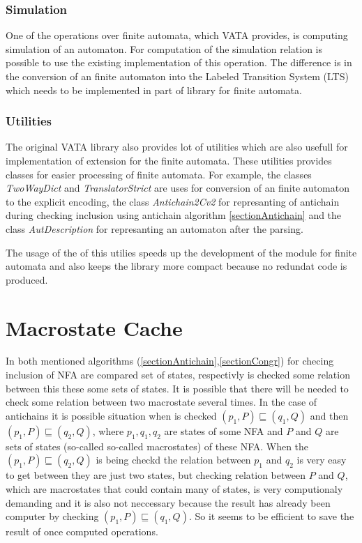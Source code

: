 \subsubsection{Simulation}
One of the operations over finite automata, which VATA provides, is computing simulation of an automaton. For computation of the simulation relation
is possible to use the existing implementation of this operation. 
The difference is in the conversion of an finite automaton into the Labeled Transition System (LTS) which
needs to be implemented in part of library for finite automata.

\subsubsection{Utilities}
The original VATA library also provides lot of utilities which are also usefull for implementation of extension for the finite automata. These utilities
provides classes for easier processing of finite automata. For example, the classes \emph{TwoWayDict} and \emph{TranslatorStrict} are uses for conversion
of an finite automaton to the explicit encoding, the class \emph{Antichain2Cv2} for represanting of antichain during checking inclusion using
antichain algorithm \ref{sectionAntichain} and the class \emph{AutDescription} for represanting an automaton after the parsing.

The usage of the of this utilies speeds up the development of the module for finite automata and also keeps the library more compact because no
redundat code is produced.

\section{Macrostate Cache}
\label{sectionCache}
In both mentioned algorithms (\ref{sectionAntichain},\ref{sectionCongr}) for checing inclusion of NFA are compared set of states, 
respectivly is checked some relation between this these some sets of states. It is possible that there will be needed to check some relation between
two macrostate several times. In the case of antichains it is possible situation when is checked $(p_1,P) \sqsubseteq (q_1,Q)$ and then $(p_1,P)\sqsubseteq
(q_2,Q)$, where $p_1,q_1,q_2$ are states of some NFA and $P$ and $Q$ are sets of states (so-called  so-called macrostates) of these NFA. 
When the $(p_1,P)\sqsubseteq(q_2,Q)$ is being checkd the relation between $p_1$ and $q_2$ is very easy to get between they are just two states, but checking
relation between $P$ and $Q$, which are macrostates that could contain many of states, is very computionaly demanding and it is also not neccessary because
the result has already been computer by checking $(p_1,P) \sqsubseteq (q_1,Q)$. So it seems to be efficient to save the result of once computed
operations.

